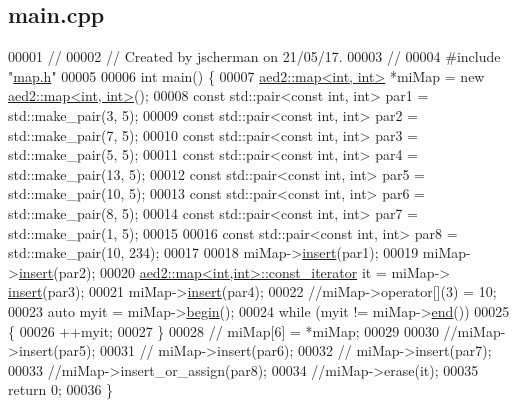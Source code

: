 \hypertarget{main_8cpp_source}{\subsection{main.\-cpp}
}

\begin{DoxyCode}
00001 \textcolor{comment}{//}
00002 \textcolor{comment}{// Created by jscherman on 21/05/17.}
00003 \textcolor{comment}{//}
00004 \textcolor{preprocessor}{#include "\hyperlink{map_8h}{map.h}"}
00005 
00006 \textcolor{keywordtype}{int} main() \{
00007     \hyperlink{classaed2_1_1map}{aed2::map<int, int>} *miMap = \textcolor{keyword}{new} \hyperlink{classaed2_1_1map}{aed2::map<int, int>}();
00008     \textcolor{keyword}{const} std::pair<const int, int> par1 = std::make\_pair(3, 5);
00009     \textcolor{keyword}{const} std::pair<const int, int> par2 = std::make\_pair(7, 5);
00010     \textcolor{keyword}{const} std::pair<const int, int> par3 = std::make\_pair(5, 5);
00011     \textcolor{keyword}{const} std::pair<const int, int> par4 = std::make\_pair(13, 5);
00012     \textcolor{keyword}{const} std::pair<const int, int> par5 = std::make\_pair(10, 5);
00013     \textcolor{keyword}{const} std::pair<const int, int> par6 = std::make\_pair(8, 5);
00014     \textcolor{keyword}{const} std::pair<const int, int> par7 = std::make\_pair(1, 5);
00015 
00016     \textcolor{keyword}{const} std::pair<const int, int> par8 = std::make\_pair(10, 234);
00017 
00018     miMap->\hyperlink{classaed2_1_1map_a6941cde9a79c27f054b5c97a587a1854_a6941cde9a79c27f054b5c97a587a1854}{insert}(par1);
00019     miMap->\hyperlink{classaed2_1_1map_a6941cde9a79c27f054b5c97a587a1854_a6941cde9a79c27f054b5c97a587a1854}{insert}(par2);
00020     \hyperlink{classaed2_1_1map_1_1const__iterator}{aed2::map<int,int>::const\_iterator} it = miMap->
      \hyperlink{classaed2_1_1map_a6941cde9a79c27f054b5c97a587a1854_a6941cde9a79c27f054b5c97a587a1854}{insert}(par3);
00021     miMap->\hyperlink{classaed2_1_1map_a6941cde9a79c27f054b5c97a587a1854_a6941cde9a79c27f054b5c97a587a1854}{insert}(par4);
00022     \textcolor{comment}{//miMap->operator[](3) = 10;}
00023     \textcolor{keyword}{auto} myit = miMap->\hyperlink{classaed2_1_1map_a58a95705d54b3dda7f775ce5a22225cb_a58a95705d54b3dda7f775ce5a22225cb}{begin}();
00024     \textcolor{keywordflow}{while} (myit != miMap->\hyperlink{classaed2_1_1map_a76023e6a56cb625513e1b5ea028bf983_a76023e6a56cb625513e1b5ea028bf983}{end}())
00025     \{
00026         ++myit;
00027     \}
00028    \textcolor{comment}{// miMap[6] = *miMap;}
00029 
00030     \textcolor{comment}{//miMap->insert(par5);}
00031    \textcolor{comment}{// miMap->insert(par6);}
00032    \textcolor{comment}{// miMap->insert(par7);}
00033     \textcolor{comment}{//miMap->insert\_or\_assign(par8);}
00034     \textcolor{comment}{//miMap->erase(it);}
00035     \textcolor{keywordflow}{return} 0;
00036 \}
\end{DoxyCode}
